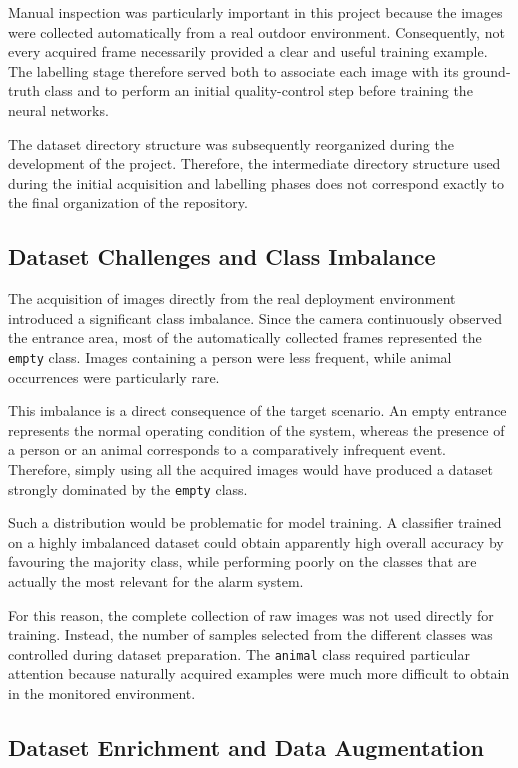 \documentclass{article}
\begin{document}
Manual inspection was particularly important in this project because the
images were collected automatically from a real outdoor environment.
Consequently, not every acquired frame necessarily provided a clear and
useful training example. The labelling stage therefore served both to
associate each image with its ground-truth class and to perform an initial
quality-control step before training the neural networks.

The dataset directory structure was subsequently reorganized during the
development of the project. Therefore, the intermediate directory structure
used during the initial acquisition and labelling phases does not correspond
exactly to the final organization of the repository.

\subsection{Dataset Challenges and Class Imbalance}
\label{subsec:dataset-imbalance}

The acquisition of images directly from the real deployment environment
introduced a significant class imbalance. Since the camera continuously
observed the entrance area, most of the automatically collected frames
represented the \texttt{empty} class. Images containing a person were less
frequent, while animal occurrences were particularly rare.

This imbalance is a direct consequence of the target scenario. An empty
entrance represents the normal operating condition of the system, whereas
the presence of a person or an animal corresponds to a comparatively
infrequent event. Therefore, simply using all the acquired images would
have produced a dataset strongly dominated by the \texttt{empty} class.

Such a distribution would be problematic for model training. A classifier
trained on a highly imbalanced dataset could obtain apparently high overall
accuracy by favouring the majority class, while performing poorly on the
classes that are actually the most relevant for the alarm system.

For this reason, the complete collection of raw images was not used directly
for training. Instead, the number of samples selected from the different
classes was controlled during dataset preparation. The \texttt{animal}
class required particular attention because naturally acquired examples
were much more difficult to obtain in the monitored environment.

\subsection{Dataset Enrichment and Data Augmentation}
\label{subsec:data-augmentation}
\end{document}
